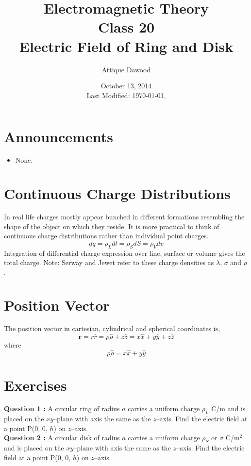\documentclass[12pt,a4paper]{article}
\title{Electromagnetic Theory\\Class 20\\Electric Field of Ring and Disk}
\author{Attique Dawood}
\date{October 13, 2014\\[0.2cm] Last Modified: \today, \currenttime}
\begin{document}
\maketitle
\section{Announcements}
\begin{itemize}
\item None.
\end{itemize}
\section{Continuous Charge Distributions}
In real life charges mostly appear bunched in different formations resembling the shape of the object on which they reside. It is more practical to think of continuous charge distributions rather than individual point charges.
\begin{equation}
dq=\rho_Ldl=\rho_SdS=\rho_Vdv
\end{equation}
Integration of differential charge expression over line, surface or volume gives the total charge.
Note: Serway and Jewet \cite{Serway} refer to these charge densities as $\lambda$, $\sigma$ and $\rho$.
\section{Position Vector}
The position vector in cartesian, cylindrical and spherical coordinates is,
\begin{equation}
\textbf{r}=r\hat r=\rho\hat{\rho}+z\hat z=x\hat x+y\hat y+z\hat z
\end{equation}
where
\begin{equation}
\rho\hat{\rho}=x\hat x+y\hat y
\end{equation}
\section{Exercises}
\noindent\textbf{Question 1 \cite[Example 4.4, page 117]{Sadiku}\cite[Example 23.8, page 721]{Serway}:} A circular ring of radius $a$ carries a uniform charge $\rho_L$ C/m and is placed on the $xy$--plane with axis the same as the $z$--axis. Find the electric field at a point P(0, 0, $h$) on $z$--axis.\\[0.2cm]
\noindent\textbf{Question 2 \cite[Practice Exercise 4.4, page 119]{Sadiku}\cite[Example 23.9, page 722]{Serway}:} A circular disk of radius $a$ carries a uniform charge $\rho_S$ or $\sigma$ C/m$^2$ and is placed on the $xy$--plane with axis the same as the $z$--axis. Find the electric field at a point P(0, 0, $h$) on $z$--axis.


\end{document}
